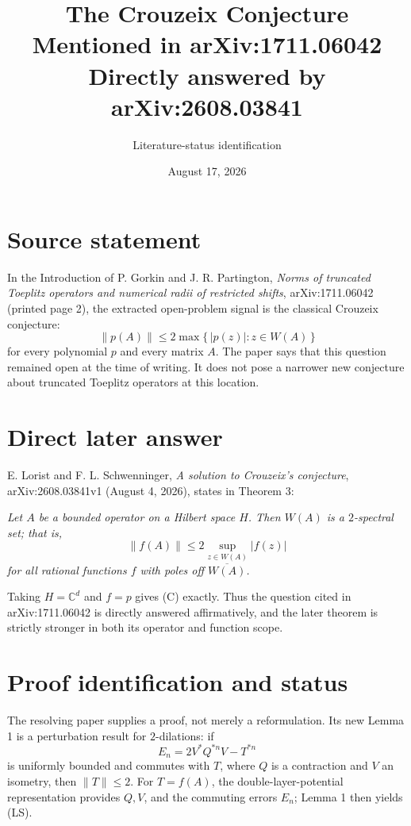 \documentclass[11pt]{article}
\title{The Crouzeix Conjecture Mentioned in arXiv:1711.06042\\
\large Directly answered by arXiv:2608.03841}
\author{Literature-status identification}
\date{August 17, 2026}
\begin{document}
\maketitle

\section*{Source statement}

In the Introduction of P. Gorkin and J. R. Partington, \emph{Norms of truncated Toeplitz operators and numerical radii of restricted shifts}, arXiv:1711.06042 (printed page 2), the extracted open-problem signal is the classical Crouzeix conjecture:
\[
  \|p(A)\|\le 2\max\{\,|p(z)|:z\in W(A)\,\}
  \tag{C}
\]
for every polynomial $p$ and every matrix $A$. The paper says that this question remained open at the time of writing. It does not pose a narrower new conjecture about truncated Toeplitz operators at this location.

\section*{Direct later answer}

E. Lorist and F. L. Schwenninger, \emph{A solution to Crouzeix's conjecture}, arXiv:2608.03841v1 (August 4, 2026), states in Theorem 3:

\medskip
\emph{Let $A$ be a bounded operator on a Hilbert space $H$. Then $W(A)$ is a $2$-spectral set; that is,}
\[
  \|f(A)\|\le 2\sup_{z\in W(A)}|f(z)|
  \tag{LS}
\]
\emph{for all rational functions $f$ with poles off $\overline{W(A)}$.}
\medskip

Taking $H=\mathbb C^d$ and $f=p$ gives (C) exactly. Thus the question cited in arXiv:1711.06042 is directly answered affirmatively, and the later theorem is strictly stronger in both its operator and function scope.

\section*{Proof identification and status}

The resolving paper supplies a proof, not merely a reformulation. Its new Lemma 1 is a perturbation result for $2$-dilations: if
\[
 E_n=2V^*Q^{*n}V-T^{*n}
\]
is uniformly bounded and commutes with $T$, where $Q$ is a contraction and $V$ an isometry, then $\|T\|\le2$. For $T=f(A)$, the double-layer-potential representation provides $Q,V$, and the commuting errors $E_n$; Lemma 1 then yields (LS).
\end{document}
